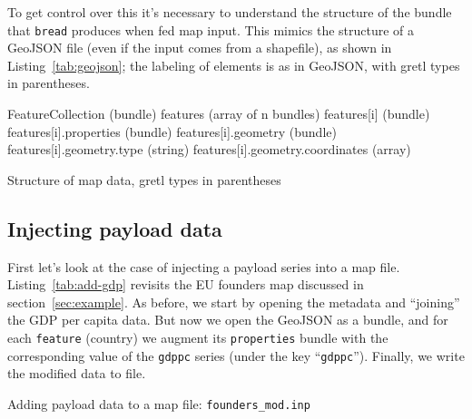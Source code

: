 \documentclass{article}
\begin{document}
To get control over this it's necessary to understand the structure of
the bundle that \texttt{bread} produces when fed map input. This
mimics the structure of a GeoJSON file (even if the input comes from a
shapefile), as shown in Listing~\ref{tab:geojson}; the labeling of
elements is as in GeoJSON, with gretl types in parentheses.

\begin{script}[htbp]
\begin{scode}
FeatureCollection (bundle)
  features (array of n bundles)
    features[i] (bundle)
      features[i].properties (bundle)
      features[i].geometry   (bundle)
        features[i].geometry.type (string)
        features[i].geometry.coordinates (array)
\end{scode}
  \caption{Structure of map data, gretl types in parentheses}
  \label{tab:geojson}
\end{script}

\subsection{Injecting payload data}
\label{sec:inject}

First let's look at the case of injecting a payload series into a map
file. Listing~\ref{tab:add-gdp} revisits the EU founders map discussed
in section~\ref{sec:example}.  As before, we start by opening the
metadata and ``joining'' the GDP per capita data. But now we open the
GeoJSON as a bundle, and for each \texttt{feature} (country) we
augment its \texttt{properties} bundle with the corresponding value of
the \texttt{gdppc} series (under the key ``\texttt{gdppc}''). Finally,
we write the modified data to file.

\begin{script}[p]
  \caption{Adding payload data to a map file:
    \texttt{founders\_mod.inp}}
  \label{tab:add-gdp}
\end{script}
\end{document}
